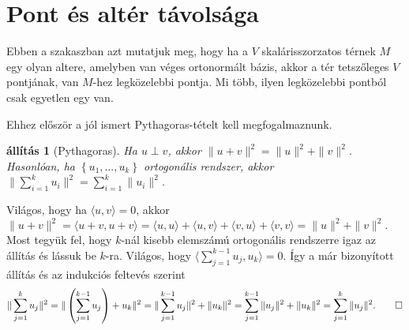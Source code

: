 \documentclass[9pt, a4paper, showtrims]{memoir}
\makeatletter
\renewenvironment{proof}[1][\proofname]
    {\par\pushQED{\qed}%
    \normalfont \topsep6\p@\@plus6\p@\relax
    \trivlist
    \item[\hskip\labelsep
        \itshape
    #1\@addpunct{:}]\ignorespaces}
    {\popQED\endtrivlist\@endpefalse}
\theoremstyle{plain}
\newtheorem{proposition}{állítás}[chapter]
\theoremstyle{remark}
\theoremstyle{definition}
\newcommand{\ip}[2]{\langle#1,#2\rangle}
\makeatother
\begin{document}
\section{Pont és altér távolsága}
Ebben a szakaszban azt mutatjuk meg, hogy ha a $V$ skalárisszorzatos térnek $M$ egy olyan
altere, amelyben van véges ortonormált bázis, akkor a tér tetszőleges $V$ pontjának,
van $M$-hez legközelebbi pontja.
Mi több, ilyen legközelebbi pontból csak egyetlen egy van.

Ehhez először a jól ismert Pythagoras-tételt kell megfogalmaznunk.

\begin{proposition}[Pythagoras]
	Ha $u\perp v$, akkor $\|u+v\|^2=\|u\|^2+\|v\|^2$.
	Hasonlóan, ha $\left\{ u_1,\ldots,u_k \right\}$ ortogonális rendszer, akkor
	$\|\sum_{i=1}^ku_i\|^2=\sum_{i=1}^k\|u_i\|^2$.
\end{proposition}
\begin{proof}
	Világos, hogy ha $\ip{u}{v}=0$,
	akkor
	\begin{math}
		\|u+v\|^2
		=
		\ip{u+v}{u+v}
		=\ip{u}{u}+\ip{u}{v}+\ip{v}{u}+\ip{v}{v}
		=
		\|u\|^2+\|v\|^2.
	\end{math}
	Most tegyük fel, hogy $k$-nál kisebb elemszámú ortogonális rendszerre igaz az állítás
	és lássuk be $k$-ra.
	Világos, hogy
	\begin{math}
		\ip{\sum_{j=1}^{k-1}u_j}{u_k}=0.
	\end{math}
	Így a már bizonyított állítás és az indukciós feltevés szerint
	\[
		\|\sum_{j=1}^ku_j\|^2
		=
		\|\left( \sum_{j=1}^{k-1}u_j \right)+u_k\|^2
		=
		\|\sum_{j=1}^{k-1}u_j\|^2+\|u_k\|^2
		=
		\sum_{j=1}^{k-1}\|u_j\|^2+\|u_k\|^2
		=
		\sum_{j=1}^k\|u_j\|^2.
		\qedhere
	\]
\end{proof}
\end{document}
